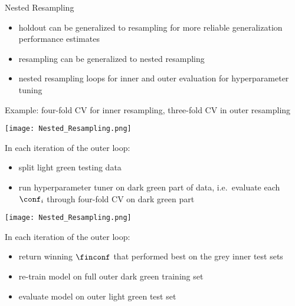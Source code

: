     \begin{frame}[c,allowframebreaks]{Nested Resampling}

        \begin{itemize}
            \item holdout can be generalized to resampling for more reliable
                generalization performance estimates
            \item resampling can be generalized to nested resampling
            \item nested resampling loops for inner and outer evaluation for
                hyperparameter tuning
        \end{itemize}

    \framebreak

    Example: four-fold CV for inner resampling, three-fold CV in outer
    resampling

    \begin{center}
        \texttt{[image: Nested\_Resampling.png]}
    \end{center}

    \framebreak

    \begin{footnotesize}
    In each iteration of the outer loop:
    \begin{itemize}
    \item split light green testing data
    \item run hyperparameter tuner on dark green part of data, i.e.\
      evaluate each $\conf_i$ through four-fold CV on dark green part
    \end{itemize}
    \end{footnotesize}

    \begin{center}
        \texttt{[image: Nested\_Resampling.png]}
    \end{center}

    \framebreak

    \begin{footnotesize}
    In each iteration of the outer loop:
    \begin{itemize}
    \item return winning $\finconf$ that performed best on the grey inner test sets
    \item re-train model on full outer dark green training set
    \item evaluate model on outer light green test set
    \end{itemize}
    \end{footnotesize}


\end{frame}
